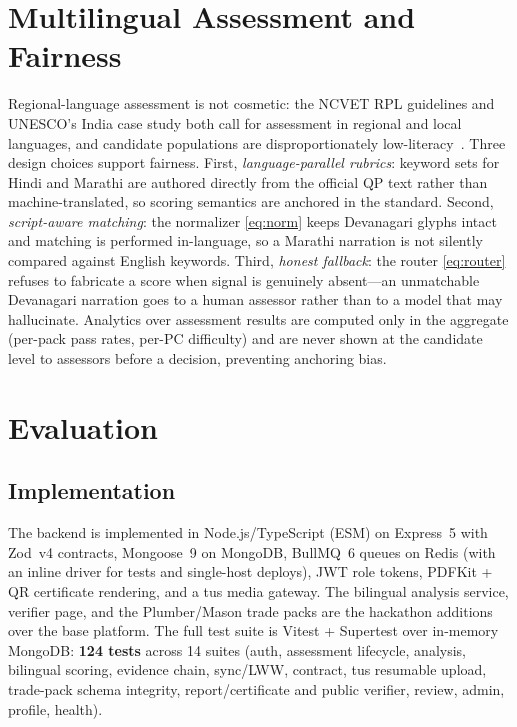 \documentclass[conference]{IEEEtran}
\begin{document}
\section{Multilingual Assessment and Fairness}
Regional-language assessment is not cosmetic: the NCVET RPL guidelines and UNESCO's
India case study both call for assessment in regional and local languages, and candidate
populations are disproportionately low-literacy~\cite{ncvet_rpl,unesco_uil}. Three design
choices support fairness. First, \emph{language-parallel rubrics}: keyword sets for Hindi
and Marathi are authored directly from the official QP text rather than machine-translated,
so scoring semantics are anchored in the standard. Second, \emph{script-aware matching}: the
normalizer \eqref{eq:norm} keeps Devanagari glyphs intact and matching is performed
in-language, so a Marathi narration is not silently compared against English keywords.
Third, \emph{honest fallback}: the router \eqref{eq:router} refuses to fabricate a score when
signal is genuinely absent---an unmatchable Devanagari narration goes to a human assessor
rather than to a model that may hallucinate. Analytics over assessment results are computed
only in the aggregate (per-pack pass rates, per-PC difficulty) and are never shown at the
candidate level to assessors before a decision, preventing anchoring bias.

\section{Evaluation}
\subsection{Implementation}
The backend is implemented in Node.js/TypeScript (ESM) on Express~5 with Zod~v4
contracts, Mongoose~9 on MongoDB, BullMQ~6 queues on Redis (with an inline driver for
tests and single-host deploys), JWT role tokens, PDFKit + QR certificate rendering, and a
tus media gateway. The bilingual analysis service, verifier page, and the Plumber/Mason
trade packs are the hackathon additions over the base platform. The full test suite is
Vitest + Supertest over in-memory MongoDB: \textbf{124 tests} across 14 suites (auth,
assessment lifecycle, analysis, bilingual scoring, evidence chain, sync/LWW, contract,
tus resumable upload, trade-pack schema integrity, report/certificate and public verifier,
review, admin, profile, health).
\end{document}
